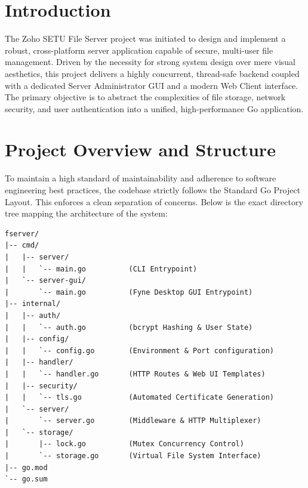\documentclass[12pt, a4paper]{article}
\begin{document}
\newpage
\tableofcontents

\newpage
\section{Introduction}
The Zoho SETU File Server project was initiated to design and implement a robust, cross-platform server application capable of secure, multi-user file management. Driven by the necessity for strong system design over mere visual aesthetics, this project delivers a highly concurrent, thread-safe backend coupled with a dedicated Server Administrator GUI and a modern Web Client interface. The primary objective is to abstract the complexities of file storage, network security, and user authentication into a unified, high-performance Go application.

\section{Project Overview and Structure}
To maintain a high standard of maintainability and adherence to software engineering best practices, the codebase strictly follows the Standard Go Project Layout. This enforces a clean separation of concerns. Below is the exact directory tree mapping the architecture of the system:

\begin{verbatim}
fserver/
|-- cmd/
|   |-- server/
|   |   `-- main.go          (CLI Entrypoint)
|   `-- server-gui/
|       `-- main.go          (Fyne Desktop GUI Entrypoint)
|-- internal/
|   |-- auth/
|   |   `-- auth.go          (bcrypt Hashing & User State)
|   |-- config/
|   |   `-- config.go        (Environment & Port configuration)
|   |-- handler/
|   |   `-- handler.go       (HTTP Routes & Web UI Templates)
|   |-- security/
|   |   `-- tls.go           (Automated Certificate Generation)
|   `-- server/
|       `-- server.go        (Middleware & HTTP Multiplexer)
|   `-- storage/
|       |-- lock.go          (Mutex Concurrency Control)
|       `-- storage.go       (Virtual File System Interface)
|-- go.mod
`-- go.sum
\end{verbatim}

\newpage
\end{document}
